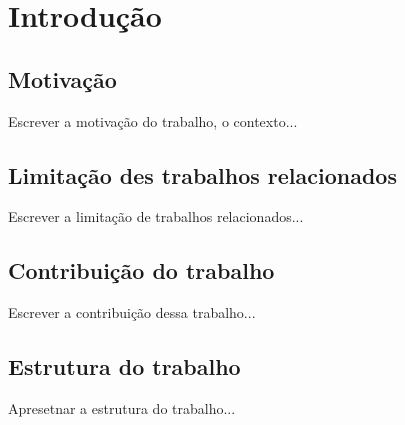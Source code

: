 \chapter{Introdução}

\section{Motivação}
Escrever a motivação do trabalho, o contexto...

\section{Limitação des trabalhos relacionados}
Escrever a limitação de trabalhos relacionados...

\section{Contribuição do trabalho}
Escrever a contribuição dessa trabalho...

\section{Estrutura do trabalho}
Apresetnar a estrutura do trabalho...
